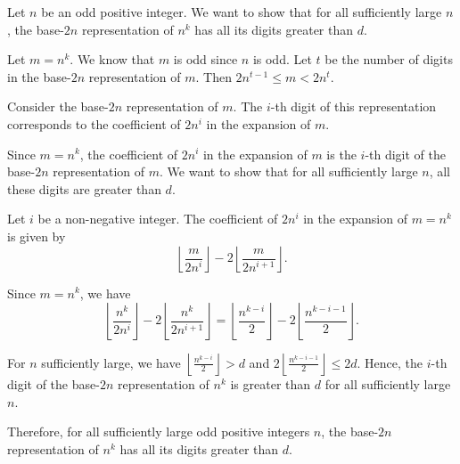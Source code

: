 Let $n$ be an odd positive integer. We want to show that for all sufficiently large $n$, the base-$2n$ representation of $n^k$ has all its digits greater than $d$.

Let $m = n^k$. We know that $m$ is odd since $n$ is odd. Let $t$ be the number of digits in the base-$2n$ representation of $m$. Then $2n^{t-1} \leq m < 2n^t$.

Consider the base-$2n$ representation of $m$. The $i$-th digit of this representation corresponds to the coefficient of $2n^i$ in the expansion of $m$.

Since $m = n^k$, the coefficient of $2n^i$ in the expansion of $m$ is the $i$-th digit of the base-$2n$ representation of $m$. We want to show that for all sufficiently large $n$, all these digits are greater than $d$.

Let $i$ be a non-negative integer. The coefficient of $2n^i$ in the expansion of $m = n^k$ is given by
$$
\left\lfloor \frac{m}{2n^i} \right\rfloor - 2\left\lfloor \frac{m}{2n^{i+1}} \right\rfloor.
$$

Since $m = n^k$, we have
$$
\left\lfloor \frac{n^k}{2n^i} \right\rfloor - 2\left\lfloor \frac{n^k}{2n^{i+1}} \right\rfloor = \left\lfloor \frac{n^{k-i}}{2} \right\rfloor - 2\left\lfloor \frac{n^{k-i-1}}{2} \right\rfloor.
$$

For $n$ sufficiently large, we have $\left\lfloor \frac{n^{k-i}}{2} \right\rfloor > d$ and $2\left\lfloor \frac{n^{k-i-1}}{2} \right\rfloor \leq 2d$. Hence, the $i$-th digit of the base-$2n$ representation of $n^k$ is greater than $d$ for all sufficiently large $n$.

Therefore, for all sufficiently large odd positive integers $n$, the base-$2n$ representation of $n^k$ has all its digits greater than $d$.
